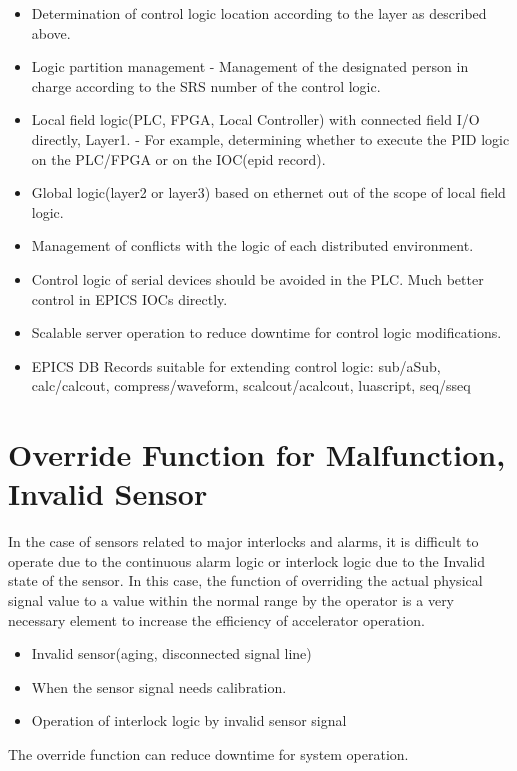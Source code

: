 \documentclass[11pt
  , letterpaper
  , article
  , oneside
  , showtrims
]{memoir}
\begin{document}
\begin{itemize}
	\item Determination of control logic location according to the layer as described above.
	\item Logic partition management
	\newline 
	- Management of the designated person in charge according to the SRS number of the control logic.
	\item Local field logic(PLC, FPGA, Local Controller) with connected field I/O directly, Layer1.
	\newline
	- For example, determining whether to execute the PID logic on the PLC/FPGA or on the IOC(epid record).
	\item Global logic(layer2 or layer3) based on ethernet out of the scope of local field logic.
	\item Management of conflicts with the logic of each distributed environment.
	\item Control logic of serial devices should be avoided in the PLC. Much better control in EPICS IOCs directly.
	\item Scalable server operation to reduce downtime for control logic modifications.
	\item EPICS DB Records suitable for extending control logic: sub/aSub, calc/calcout, compress/waveform, scalcout/acalcout, luascript, seq/sseq
\end{itemize}

\section{Override Function for Malfunction, Invalid Sensor }
In the case of sensors related to major interlocks and alarms, it is difficult to operate due to the continuous alarm logic or interlock logic due to the Invalid state of the sensor. In this case, the function of overriding the actual physical signal value to a value within the normal range by the operator is a very necessary element to increase the efficiency of accelerator operation.

\begin{itemize}
	\item Invalid sensor(aging, disconnected signal line)
	\item When the sensor signal needs calibration.
	\item Operation of interlock logic by invalid sensor signal
\end{itemize}
The override function can reduce downtime for system operation.
\end{document}
